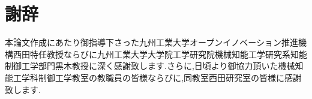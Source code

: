 \section*{謝辞}
本論文作成にあたり御指導下さった九州工業大学オープンイノベーション推進機構西田特任教授ならびに九州工業大学大学院工学研究院機械知能工学研究系知能制御工学部門黒木教授に深く感謝致します.さらに,日頃より御協力頂いた機械知能工学科制御工学教室の教職員の皆様ならびに,同教室西田研究室の皆様に感謝致します.